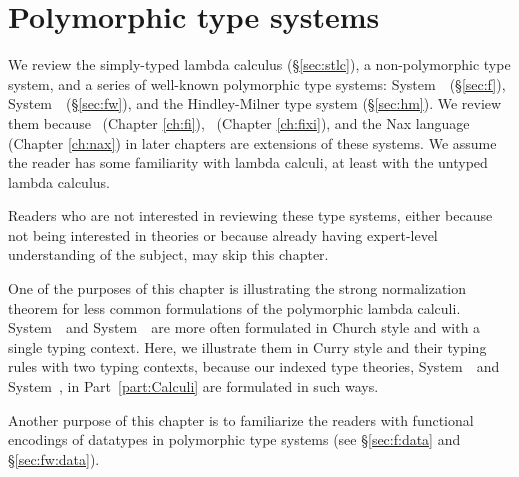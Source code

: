 \chapter{Polymorphic type systems}\label{ch:poly}
We review the simply-typed lambda calculus (\S\ref{sec:stlc}),
a non-polymorphic type system, and
a series of well-known polymorphic type systems:
System~\F\ (\S\ref{sec:f}), System~\Fw\ (\S\ref{sec:fw}),
and the Hindley-Milner type system (\S\ref{sec:hm}).
We review them because \Fi\ (Chapter \ref{ch:fi}),
\Fixi\ (Chapter \ref{ch:fixi}), and the Nax language (Chapter \ref{ch:nax})
in later chapters are extensions of these systems. We assume the reader has
some familiarity with lambda calculi, at least with the untyped lambda calculus.

Readers who are not interested in reviewing these type systems,
either because not being interested in theories
or because already having expert-level understanding of the subject,
may skip this chapter.

One of the purposes of this chapter is illustrating
the strong normalization theorem for less common formulations of
the polymorphic lambda calculi. System~\F\ and System~\Fw\ are more often
formulated in Church style and with a single typing context. Here,
we illustrate them in Curry style and their typing rules with two
typing contexts, because our indexed type theories, System~\Fi\ and
System~\Fixi, in Part~\ref{part:Calculi} are formulated in such ways.

Another purpose of this chapter is to familiarize the readers with
functional encodings of datatypes in polymorphic type systems
(see \S\ref{sec:f:data} and \S\ref{sec:fw:data}).



